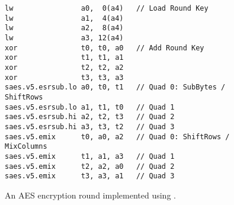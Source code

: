 \begin{figure}[!h]
\begin{lstlisting}[language=pseudo,style=block]
lw                a0,  0(a4)   // Load Round Key
lw                a1,  4(a4)
lw                a2,  8(a4)
lw                a3, 12(a4)
xor               t0, t0, a0   // Add Round Key
xor               t1, t1, a1
xor               t2, t2, a2
xor               t3, t3, a3
saes.v5.esrsub.lo a0, t0, t1   // Quad 0: SubBytes / ShiftRows
saes.v5.esrsub.lo a1, t1, t0   // Quad 1
saes.v5.esrsub.hi a2, t2, t3   // Quad 2
saes.v5.esrsub.hi a3, t3, t2   // Quad 3
saes.v5.emix      t0, a0, a2   // Quad 0: ShiftRows / MixColumns
saes.v5.emix      t1, a1, a3   // Quad 1
saes.v5.emix      t2, a2, a0   // Quad 2
saes.v5.emix      t3, a3, a1   // Quad 3
\end{lstlisting}
\caption{
  An AES encryption round implemented using .
}
\label{fig:v5:round}
\end{figure}

\vspace*{\fill}


